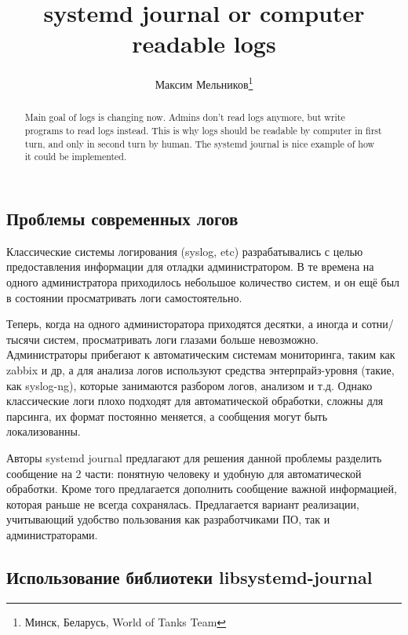 \documentclass[10pt, a5paper]{article}
\begin{document}
\title{systemd journal or computer readable logs}%

\author{Максим Мельников\footnote{Минск, Беларусь, World of Tanks Team}}
\maketitle

\begin{abstract}
Main goal of logs is changing now. Admins don't read logs anymore, but write programs to read logs instead. This is why logs should be readable by computer in first turn, and only in second turn by human.
The systemd journal is nice example of how it could be implemented.
\end{abstract}

\subsection*{Проблемы современных логов}

Классические системы логирования (syslog, etc) разрабатывались с целью предоставления информации для отладки администратором. В те времена на одного администратора приходилось небольшое количество систем, и он ещё был в состоянии просматривать логи самостоятельно.

Теперь, когда на одного администоратора приходятся десятки, а иногда и сотни/тысячи систем, просматривать логи глазами больше невозможно. Администраторы прибегают к автоматическим системам мониторинга, таким как zabbix и др, а для анализа логов используют средства энтерпрайз-уровня (такие, как syslog-ng), которые занимаются разбором логов, анализом и т.д. Однако классические логи плохо подходят для автоматической обработки, сложны для парсинга, их формат постоянно меняется, а сообщения могут быть локализованны.

Авторы systemd journal предлагают для решения данной проблемы разделить сообщение на 2 части: понятную человеку и удобную для автоматической обработки. Кроме того предлагается дополнить сообщение важной информацией, которая раньше не всегда сохранялась. Предлагается вариант реализации, учитывающий удобство пользования как разработчиками ПО, так и администраторами.

\subsection*{Использование библиотеки libsystemd-journal}
\end{document}

